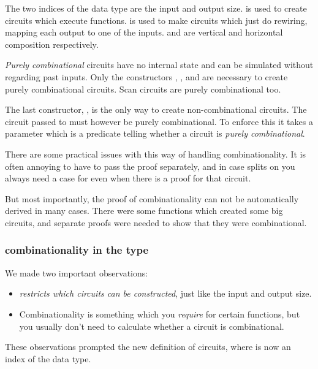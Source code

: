 The two indices of the data type are the input and output
size.
 is used to create circuits which execute functions.
 is used to make circuits which just do rewiring, mapping
each output to one of the inputs.
 and  are vertical and horizontal composition respectively.

\emph{Purely combinational} circuits have no internal state and can be
simulated without regarding past inputs.
Only the constructors , ,  and  are
necessary to create purely combinational circuits.
Scan circuits are purely combinational too.

The last constructor, , is the only way to create
non-combinational circuits.
The circuit passed to  must however be purely
combinational.
To enforce this it takes a parameter  \AY{:}  
which is a predicate telling whether a circuit is \emph{purely
  combinational}.

There are some practical issues with this way of handling
combinationality.
It is often annoying to have to pass the  proof separately,
and in case splits on  you always need a case for 
even when there is a  proof for that circuit.

But most importantly, the proof of combinationality can not be
automatically derived in many cases.
There were some functions which created some big circuits, and
separate proofs were needed to show that they were combinational.

\subsubsection{combinationality in the
  type}\label{combinationality-in-the-type}

We made two important observations:

\begin{itemize}
\item {} \emph{restricts which circuits can be constructed},
  just like the input and output size.
\item Combinationality is something which you \emph{require} for
  certain functions, but you usually don't need to calculate whether a
  circuit is combinational.
\end{itemize}

These observations prompted the new definition of circuits, where
 \AY{:}  is now an index of the data type.

